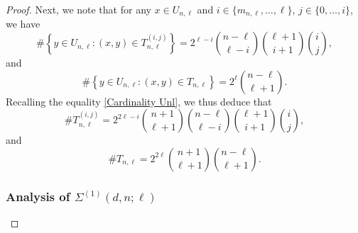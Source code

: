 \documentclass[10pt,a4paper]{amsart}
\begin{document}
\begin{proof}
Next, we note that for any $x \in U_{n,\ell}$ and $i \in \{m_{n,\ell}, \dots, \ell\}$, $j \in \{0, \dots, i\}$, we have 
\begin{equation*}
\# \left \{ y \in U_{n,\ell} : (x, y) \in T_{n,\ell}^{(i,j)} \right\} = 2^{\ell-i} \binom{n-\ell}{\ell-i} \binom{\ell+1}{i+1} \binom{i}{j},
\end{equation*}
and
\begin{equation*}
\# \left \{ y \in U_{n,\ell} : (x, y) \in T_{n,\ell} \right\} = 2^{\ell} \binom{n-\ell}{\ell+1}.
\end{equation*}
Recalling the equality \eqref{Cardinality Unl}, we thus deduce that
\begin{equation}
\label{Cardinality Tnlij}
\# T_{n,\ell}^{(i,j)} = 2^{2\ell-i} \binom{n+1}{\ell+1} \binom{n-\ell}{\ell-i} \binom{\ell+1}{i+1} \binom{i}{j},
\end{equation}
and
\begin{equation}
\label{Cardinality Tnl}
\# T_{n,\ell} = 2^{2 \ell} \binom{n+1}{\ell+1} \binom{n-\ell}{\ell+1}.
\end{equation}

\subsubsection*{Analysis of $\Sigma^{(1)}(d,n;\ell)$}



\end{proof}
\end{document}
